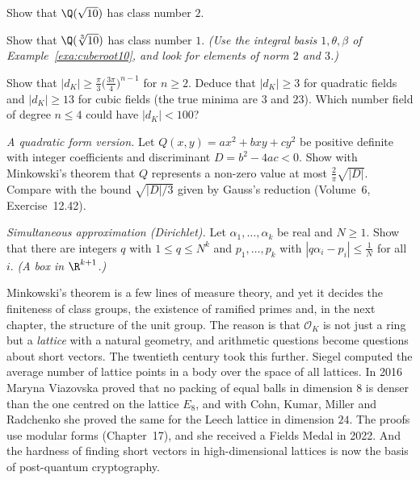 \begin{exercise}[$\star\star$]\label{ex:sqrt10}
Show that $\Q(\sqrt{10})$ has class number $2$.
\end{exercise}

\begin{exercise}[$\star\star$]\label{ex:h10}
Show that $\Q(\sqrt[3]{10})$ has class number $1$. \emph{(Use the integral basis $1,\theta,\beta$ of
Example~\ref{exa:cuberoot10}, and look for elements of norm $2$ and $3$.)}
\end{exercise}

\begin{exercise}[$\star\star$]\label{ex:discbound}
Show that $|d_K|\ge\frac\pi3\bigl(\frac{3\pi}4\bigr)^{n-1}$ for $n\ge2$. Deduce that $|d_K|\ge3$ for quadratic fields and
$|d_K|\ge13$ for cubic fields (the true minima are $3$ and $23$). Which number field of degree $n\le4$ could have
$|d_K|<100$?
\end{exercise}

\begin{exercise}[$\star\star$]\label{ex:quadmin}
\emph{A quadratic form version.} Let $Q(x,y)=ax^2+bxy+cy^2$ be positive definite with integer coefficients and
discriminant $D=b^2-4ac<0$. Show with Minkowski's theorem that $Q$ represents a non-zero value at most
$\frac2\pi\sqrt{|D|}$. Compare with the bound $\sqrt{|D|/3}$ given by Gauss's reduction (Volume~6, Exercise~12.42).
\end{exercise}

\begin{exercise}[$\star\star\star$]\label{ex:simult}
\emph{Simultaneous approximation (Dirichlet).} Let $\alpha_1,\dots,\alpha_k$ be real and $N\ge1$. Show that there are integers
$q$ with $1\le q\le N^k$ and $p_1,\dots,p_k$ with $|q\alpha_i-p_i|\le\frac1N$ for all $i$. \emph{(A box in $\R^{k+1}$.)}
\end{exercise}

\begin{beauty}
Minkowski's theorem is a few lines of measure theory, and yet it decides the finiteness of class groups, the existence of
ramified primes and, in the next chapter, the structure of the unit group. The reason is that $\mathcal O_K$ is not just
a ring but a \emph{lattice} with a natural geometry, and arithmetic questions become questions about short vectors. The
twentieth century took this further. Siegel computed the average number of lattice points in a body over the space of
all lattices. In 2016 Maryna Viazovska proved that no packing of equal balls in dimension $8$ is denser than the one
centred on the lattice $E_8$, and with Cohn, Kumar, Miller and Radchenko she proved the same for the Leech lattice in
dimension $24$. The proofs use modular forms (Chapter~17), and she received a Fields Medal in 2022. And the hardness of finding short
vectors in high-dimensional lattices is now the basis of post-quantum cryptography.
\end{beauty}

